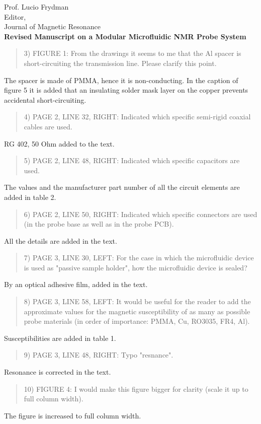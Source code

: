 \documentclass{mu-soton-letter}
\newenvironment{reviewer} {\begin{quote}\color{black!50}} {\end{quote}}
\begin{document}
\begin{letter}{Prof. Lucio Frydman\\
  Editor,\\
  Journal of Magnetic Resonance\\[2cm]
  \textbf{Revised Manuscript on a Modular Microfluidic NMR Probe System}}
\begin{reviewer}
3) FIGURE 1: From the drawings it seems to me that the Al spacer is short-circuiting the transmission line. Please clarify this point.
\end{reviewer}
The spacer is made of PMMA, hence it is non-conducting. In the caption of figure 5 it is added that an insulating solder mask layer on the copper prevents accidental short-circuiting.
\begin{reviewer}
4) PAGE 2, LINE 32, RIGHT: Indicated which specific semi-rigid coaxial cables are used.
\end{reviewer}
RG 402, 50 Ohm added to the text.
\begin{reviewer}
5) PAGE 2, LINE 48, RIGHT: Indicated which specific capacitors are used.
\end{reviewer}
The values and the manufacturer part number of all the circuit elements are added in table 2.

\begin{reviewer}
6) PAGE 2, LINE 50, RIGHT: Indicated which specific connectors are used (in the probe base as well as in the probe PCB).
\end{reviewer}
All the details are added in the text.

\begin{reviewer}
7) PAGE 3, LINE 30, LEFT: For the case in which the microfluidic device is used as "passive sample holder", how the microfluidic device is sealed?
\end{reviewer}
By an optical adhesive film, added in the text.

\begin{reviewer}
8) PAGE 3, LINE 58, LEFT: It would be useful for the reader to add the approximate values for the magnetic susceptibility of as many as possible probe materials (in order of importance: PMMA, Cu, RO3035, FR4, Al).
\end{reviewer}
Susceptibilities are added in table 1.

\begin{reviewer}
9) PAGE 3, LINE 48, RIGHT: Typo "resnance".
\end{reviewer}
Resonance is corrected in the text.

\begin{reviewer}
10) FIGURE 4: I would make this figure bigger for clarity (scale it up to full column width).
\end{reviewer}
The figure is increased to full column width.


\end{letter}
\end{document}
